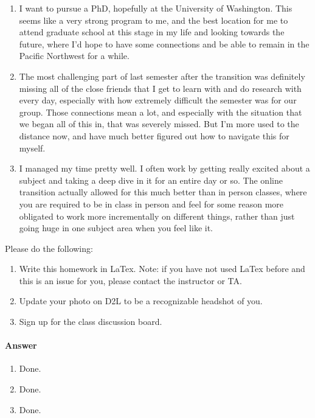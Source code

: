 \documentclass{article}
\begin{document}
\begin{enumerate}
		\item I want to pursue a PhD, hopefully at the University of Washington. This seems like
		a very strong program to me, and the best location for me to attend graduate school
		at this stage in my life and looking towards the future, where I'd hope to have some
		connections and be able to remain in the Pacific Northwest for a while.

		\item The most challenging part of last semester after the transition was definitely missing
		all of the close friends that I get to learn with and do research with every day, especially
		with how extremely difficult the semester was for our group. Those connections mean a lot,
		and especially with the situation that we began all of this in, that was severely missed.
		But I'm more used to the distance now, and have much better figured out how to navigate
		this for myself.
		
		\item I managed my time pretty well. I often work by getting really excited about a subject
		and taking a deep dive in it for an entire day or so. The online transition actually
		allowed for this much better than in person classes, where you are required to be in
		class in person and feel for some reason more obligated to work more incrementally on
		different things, rather than just going huge in one subject area when you feel like it.

	\end{enumerate}

\nextprob
{}

Please do the following:
\begin{enumerate}
    \item Write this homework in LaTex.
        Note: if you have not used LaTex before and this is an
        issue for you, please contact the instructor or TA.
    \item Update your photo on D2L to be a recognizable headshot of you.
    \item Sign up for the class discussion board.
\end{enumerate}

\paragraph{Answer}


\begin{enumerate}
	\item Done.
	\item Done.
	\item Done.
\end{enumerate}
\end{document}
